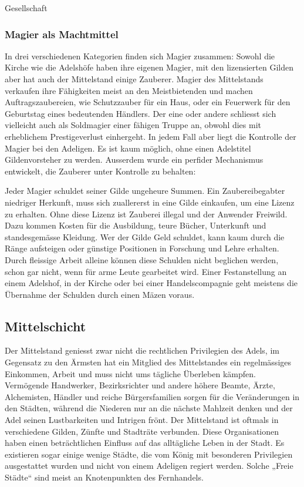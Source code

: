 \documentclass[10pt,twoside,twocolumn,openany]{book}
\newenvironment{mcolsec*}[1]{\section{#1}\begin{multicols}{2}}{
\end{multicols}}
\begin{document}
\begin{mcolsec*}{Gesellschaft}
	\subsubsection{Magier als Machtmittel}
	In drei verschiedenen Kategorien finden sich Magier zusammen: Sowohl die Kirche wie die Adelshöfe haben ihre eigenen Magier, mit den lizensierten Gilden aber hat auch der Mittelstand einige Zauberer. Magier des Mittelstands verkaufen ihre Fähigkeiten meist an den Meistbietenden und machen Auftragszaubereien, wie Schutzzauber für ein Haus, oder ein Feuerwerk für den Geburtstag eines bedeutenden Händlers. Der eine oder andere schliesst sich vielleicht auch als Soldmagier einer fähigen Truppe an, obwohl dies mit erheblichem Prestigeverlust einhergeht. In jedem Fall aber liegt die Kontrolle der Magier bei den Adeligen. Es ist kaum möglich, ohne einen Adelstitel Gildenvorsteher zu werden. Ausserdem wurde ein perfider Mechanismus entwickelt, die Zauberer unter Kontrolle zu behalten:
	
	Jeder Magier schuldet seiner Gilde ungeheure Summen. Ein Zaubereibegabter niedriger Herkunft, muss sich zuallererst in eine Gilde einkaufen, um eine Lizenz zu erhalten. Ohne diese Lizenz ist Zauberei illegal und der Anwender Freiwild. Dazu kommen Kosten für die Ausbildung, teure Bücher, Unterkunft und standesgemässe Kleidung. Wer der Gilde Geld schuldet, kann kaum durch die Ränge aufsteigen oder günstige Positionen in Forschung und Lehre erhalten. Durch fleissige Arbeit alleine können diese Schulden nicht beglichen werden, schon gar nicht, wenn für arme Leute gearbeitet wird. Einer Festanstellung an einem Adelshof, in der Kirche oder bei einer Handelscompagnie geht meistens die Übernahme der Schulden durch einen Mäzen voraus.
	\subsection{Mittelschicht}
	Der Mittelstand geniesst zwar nicht die rechtlichen Privilegien des Adels, im Gegensatz zu den Ärmsten hat ein Mitglied des Mittelstandes ein regelmässiges Einkommen, Arbeit und muss nicht ums tägliche Überleben kämpfen. Vermögende Handwerker, Bezirksrichter und andere höhere Beamte, Ärzte, Alchemisten, Händler und reiche Bürgersfamilien sorgen für die Veränderungen in den Städten, während die Niederen nur an die nächste Mahlzeit denken und der Adel seinen Lustbarkeiten und Intrigen frönt. Der Mittelstand ist oftmals in verschiedene Gilden, Zünfte und Stadträte verbunden. Diese Organisationen haben einen beträchtlichen Einfluss auf das alltägliche Leben in der Stadt. Es existieren sogar einige wenige Städte, die vom König mit besonderen Privilegien ausgestattet wurden und nicht von einem Adeligen regiert werden. Solche „Freie Städte“ sind meist an Knotenpunkten des Fernhandels.
	

\end{mcolsec*}
\end{document}
